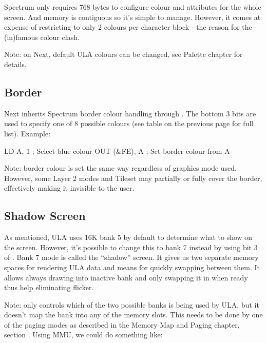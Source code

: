 Spectrum only requires 768 bytes to configure colour and attributes for the whole screen. And memory is contiguous so it's simple to manage. However, it comes at expense of restricting to only 2 colours per character block - the reason for the (in)famous colour clash.

Note: on Next, default ULA colours can be changed, see Palette chapter  for details.


\subsection{Border}

Next inherits Spectrum border colour handling through . The bottom 3 bits are used to specify one of 8 possible colours (see table on the previous page for full list). Example:

\begin{tcblisting}{}
    LD A, 1         ; Select blue colour
    OUT (&FE), A    ; Set border colour from A
\end{tcblisting}

Note: border colour is set the same way regardless of graphics mode used. However, some Layer 2 modes and Tileset may partially or fully cover the border, effectively making it invisible to the user.


\subsection{Shadow Screen}

As mentioned, ULA uses 16K bank 5 by default to determine what to show on the screen. However, it's possible to change this to bank 7 instead by using bit 3 of . Bank 7 mode is called the ``shadow'' screen. It gives us two separate memory spaces for rendering ULA data and means for quickly swapping between them. It allows always drawing into inactive bank and only swapping it in when ready thus help eliminating flicker.

Note:  only controls which of the two possible banks is being used by ULA, but it doesn't map the bank into any of the memory slots. This needs to be done by one of the paging modes as described in the Memory Map and Paging chapter, section . Using MMU, we could do something like:


